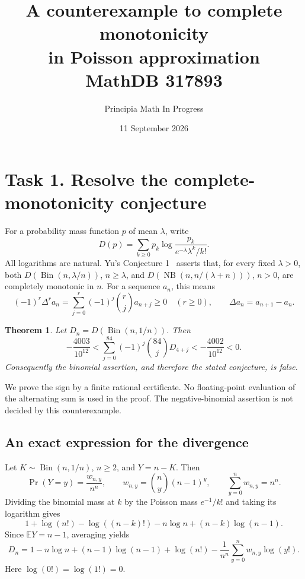\documentclass[11pt]{article}
\title{A counterexample to complete monotonicity\\
in Poisson approximation\\\large MathDB 317893}
\author{Principia Math In Progress}
\date{11 September 2026}
\newtheorem{theorem}{Theorem}
\begin{document}
\maketitle

\section*{Task 1. Resolve the complete-monotonicity conjecture}

For a probability mass function $p$ of mean $\lambda$, write
\[
 D(p)=\sum_{k\geq0}p_k\log
 \frac{p_k}{e^{-\lambda}\lambda^k/k!}.
\]
All logarithms are natural. Yu's Conjecture 1~\cite{Yu} asserts that,
for every fixed $\lambda>0$, both
$D(\operatorname{Bin}(n,\lambda/n))$, $n\geq\lambda$, and
$D(\operatorname{NB}(n,n/(\lambda+n)))$, $n>0$,
are completely monotonic in $n$. For a sequence $a_n$, this means
\[
 (-1)^r\Delta^r a_n
 =\sum_{j=0}^r(-1)^j\binom rj a_{n+j}\geq0
 \quad(r\geq0),\qquad \Delta a_n=a_{n+1}-a_n .
\]

\begin{theorem}
Let $D_n=D(\operatorname{Bin}(n,1/n))$. Then
\begin{equation}
 -\frac{4003}{10^{12}}
 <\sum_{j=0}^{84}(-1)^j\binom{84}{j}D_{4+j}
 <-\frac{4002}{10^{12}}<0.
 \label{eq:counter}
\end{equation}
Consequently the binomial assertion, and therefore the stated conjecture,
is false.
\end{theorem}

We prove the sign by a finite rational certificate. No floating-point
evaluation of the alternating sum is used in the proof.
The negative-binomial assertion is not decided by this counterexample.

\subsection*{An exact expression for the divergence}

Let $K\sim\operatorname{Bin}(n,1/n)$, $n\geq2$, and $Y=n-K$.
Then
\[
 \Pr(Y=y)=\frac{w_{n,y}}{n^n},\qquad
 w_{n,y}=\binom ny(n-1)^y,\qquad
 \sum_{y=0}^n w_{n,y}=n^n .
\]
Dividing the binomial mass at $k$ by the Poisson mass $e^{-1}/k!$
and taking its logarithm gives
\[
 1+\log(n!)-\log((n-k)!)-n\log n+(n-k)\log(n-1).
\]
Since $\mathbb EY=n-1$, averaging yields
\begin{equation}
 D_n=1-n\log n+(n-1)\log(n-1)+\log(n!)
       -\frac1{n^n}\sum_{y=0}^n w_{n,y}\log(y!).
 \label{eq:divergence}
\end{equation}
Here $\log(0!)=\log(1!)=0$.
\end{document}
